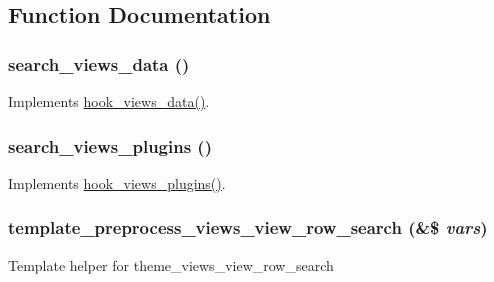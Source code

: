 \subsection{Function Documentation}
\hypertarget{search_8views_8inc_ad91fdcb8037644087387a30d3a5719ee}{
\subsubsection[{search\_\-views\_\-data}]{\setlength{\rightskip}{0pt plus 5cm}search\_\-views\_\-data ()}}
\label{search_8views_8inc_ad91fdcb8037644087387a30d3a5719ee}
Implements \hyperlink{group__views__hooks_ga227057901681e4a33e33c199c7a8c989}{hook\_\-views\_\-data()}. \hypertarget{search_8views_8inc_aef27a11e726ee0039e3ffeed38562df3}{
\subsubsection[{search\_\-views\_\-plugins}]{\setlength{\rightskip}{0pt plus 5cm}search\_\-views\_\-plugins ()}}
\label{search_8views_8inc_aef27a11e726ee0039e3ffeed38562df3}
Implements \hyperlink{group__views__hooks_ga23f6e9972b2ed84fc54b7ff63f44477d}{hook\_\-views\_\-plugins()}. \hypertarget{search_8views_8inc_ad2005db0a4841d084cadac887649bf6f}{
\subsubsection[{template\_\-preprocess\_\-views\_\-view\_\-row\_\-search}]{\setlength{\rightskip}{0pt plus 5cm}template\_\-preprocess\_\-views\_\-view\_\-row\_\-search (\&\$ {\em vars})}}
\label{search_8views_8inc_ad2005db0a4841d084cadac887649bf6f}
Template helper for theme\_\-views\_\-view\_\-row\_\-search 